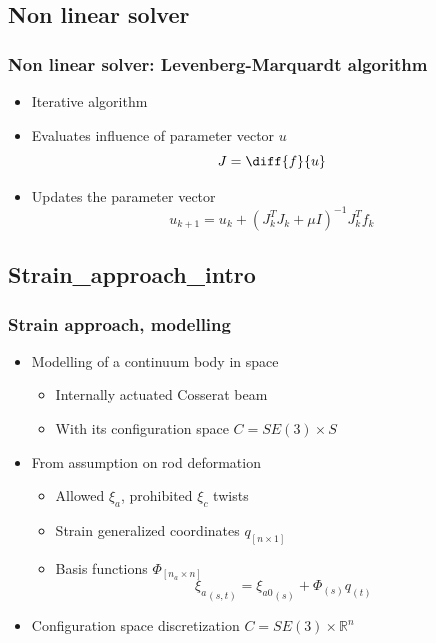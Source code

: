 \documentclass[compress]{thesisbeamer}
\begin{document}
		\subsection{Non linear solver}
        \begin{frame}
        	\frametitle{Non linear solver: Levenberg-Marquardt algorithm}
			\begin{itemize}%
  				\item Iterative algorithm
  				\item Evaluates influence of parameter vector $ u $
  				\begin{equation}
  				J = \diff{f}{u}
  				\end{equation}
  				\item Updates the parameter vector
  				\begin{equation}
  				{u}_{k+1} = {u}_{k} + {\left({J}_{k}^{T} {J}_{k} + \mu I \right)}^{-1} {J}_{k}^{T} {f}_{k}
  				\end{equation}
 			\end{itemize}
		\end{frame}
		
		\subsection{Strain_approach_intro}
        \begin{frame}
        	\frametitle{Strain approach, modelling}
			\begin{itemize}%
  				\item Modelling of a continuum body in space
  				\begin{itemize}
  					\item Internally actuated Cosserat beam
  					\item With its configuration space $ \textit{C} = SE(3) \times \textit{S} $
  				\end{itemize}
  				\item From assumption on rod deformation
  				\begin{itemize}
  					\item Allowed $ \xi_a $, prohibited $ \xi_c $ twists
  					\item Strain generalized coordinates $ q_{[n\times1]}$
  					\item Basis functions ${\Phi}_{\left[n_a \times n \right]} $
  					\begin{equation}
  						{\xi_a}_{\left(s , t \right)} = {\xi_{a0}}_{\left(s \right)} + {\Phi}_{\left(s \right)} {q}_{\left(t \right)}
  					\end{equation}
  				\end{itemize}
  				\item Configuration space discretization $ \textit{C} = SE(3) \times \mathbb{R}^n $
 			\end{itemize}
		\end{frame}
		
\end{document}
